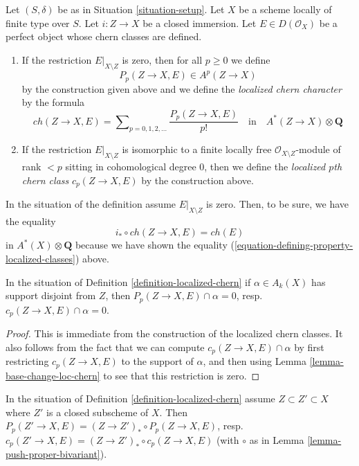 \begin{definition}
\label{definition-localized-chern}
Let $(S, \delta)$ be as in Situation \ref{situation-setup}. Let $X$ be a scheme
locally of finite type over $S$. Let $i : Z \to X$ be a closed immersion.
Let $E \in D(\mathcal{O}_X)$ be a perfect object whose chern classes
are defined.
\begin{enumerate}
\item If the restriction $E|_{X \setminus Z}$ is zero, then for all
$p \geq 0$ we define
$$
P_p(Z \to X, E) \in A^p(Z \to X)
$$
by the construction given above and we define the
{\it localized chern character} by the formula
$$
ch(Z \to X, E) =
\sum\nolimits_{p = 0, 1, 2, \ldots} \frac{P_p(Z \to X, E)}{p!}
\quad\text{in}\quad A^*(Z \to X) \otimes \mathbf{Q}
$$
\item If the restriction $E|_{X \setminus Z}$ is isomorphic to a
finite locally free $\mathcal{O}_{X \setminus Z}$-module of rank $< p$
sitting in cohomological degree $0$, then we define the
{\it localized $p$th chern class} $c_p(Z \to X, E)$ by the construction above.
\end{enumerate}
\end{definition}

\noindent
In the situation of the definition assume $E|_{X \setminus Z}$ is zero.
Then, to be sure, we have the equality
$$
i_* \circ ch(Z \to X, E) = ch(E)
$$
in $A^*(X) \otimes \mathbf{Q}$ because we have shown the
equality (\ref{equation-defining-property-localized-classes}) above.

\begin{lemma}
\label{lemma-loc-chern-disjoint}
In the situation of Definition \ref{definition-localized-chern}
if $\alpha \in A_k(X)$ has support disjoint from $Z$, then
$P_p(Z \to X, E) \cap \alpha = 0$, resp.\ $c_p(Z \to X, E) \cap \alpha = 0$.
\end{lemma}

\begin{proof}
This is immediate from the construction of the localized chern classes.
It also follows from the fact that we can compute
$c_p(Z \to X, E) \cap \alpha$ by first restricting $c_p(Z \to X, E)$ to
the support of $\alpha$, and then using Lemma \ref{lemma-base-change-loc-chern}
to see that this restriction is zero.
\end{proof}

\begin{lemma}
\label{lemma-loc-chern-shrink-Z}
In the situation of Definition \ref{definition-localized-chern}
assume $Z \subset Z' \subset X$ where $Z'$ is a closed subscheme of $X$.
Then
$P_p(Z' \to X, E) = (Z \to Z')_* \circ P_p(Z \to X, E)$,
resp.\ $c_p(Z' \to X, E) = (Z \to Z')_* \circ c_p(Z \to X, E)$
(with $\circ$ as in Lemma \ref{lemma-push-proper-bivariant}).
\end{lemma}

